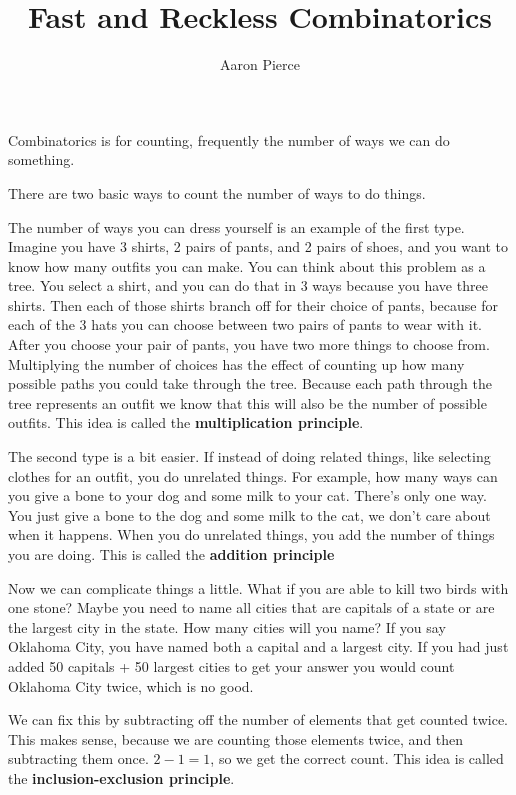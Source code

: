 \documentclass{article}
\title{Fast and Reckless Combinatorics}
\author{Aaron Pierce}
\date{}
\begin{document}
    \maketitle
    Combinatorics is for counting, frequently the number of ways we can do something.

    There are two basic ways to count the number of ways to do things.

    The number of ways you can dress yourself is an example of the first type. 
    Imagine you have 3 shirts, 2 pairs of pants, and 2 pairs of shoes, and you want to know how many outfits you can make.
    You can think about this problem as a tree.
    You select a shirt, and you can do that in 3 ways because you have three shirts.
    Then each of those shirts branch off for their choice of pants, because for each of the 3 hats you can choose between two pairs of pants to wear with it.
    After you choose your pair of pants, you have two more things to choose from.
    Multiplying the number of choices has the effect of counting up how many possible paths you could take through the tree.
    Because each path through the tree represents an outfit we know that this will also be the number of possible outfits.
    This idea is called the \textbf{multiplication principle}.

    The second type is a bit easier.
    If instead of doing related things, like selecting clothes for an outfit, you do unrelated things.
    For example, how many ways can you give a bone to your dog and some milk to your cat.
    There's only one way.
    You just give a bone to the dog and some milk to the cat, we don't care about when it happens.
    When you do unrelated things, you add the number of things you are doing.
    This is called the \textbf{addition principle}

    Now we can complicate things a little.
    What if you are able to kill two birds with one stone?
    Maybe you need to name all cities that are capitals of a state or are the largest city in the state.
    How many cities will you name?
    If you say Oklahoma City, you have named both a capital and a largest city.
    If you had just added 50 capitals + 50 largest cities to get your answer you would count Oklahoma City twice, which is no good.

    We can fix this by subtracting off the number of elements that get counted twice.
    This makes sense, because we are counting those elements twice, and then subtracting them once. $2 - 1 = 1$, so we get the correct count.
    This idea is called the \textbf{inclusion-exclusion principle}.
\end{document}
